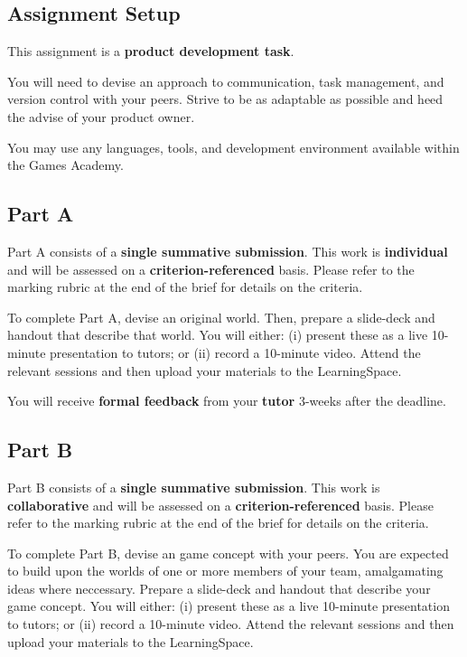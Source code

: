 \documentclass{../../fal_assignment}
\begin{document}
\subsection*{Assignment Setup}

This assignment is a \textbf{product development task}. 

You will need to devise an approach to communication, task management, and version control with your peers. Strive to be as adaptable as possible and heed the advise of your product owner.

You may use any languages, tools, and development environment available within the Games Academy.

\subsection*{Part A}

Part A consists of a \textbf{single summative submission}. This work is \textbf{individual} and will be assessed on a \textbf{criterion-referenced} basis. Please refer to the marking rubric at the end of the brief for details on the criteria.

To complete Part A, devise an original world. Then, prepare a slide-deck and handout that describe that world. You will either: (i) present these as a live 10-minute presentation to tutors; or (ii) record a 10-minute video. Attend the relevant sessions and then upload your materials to the LearningSpace.

You will receive \textbf{formal feedback} from your \textbf{tutor} 3-weeks after the deadline.

\subsection*{Part B}

Part B consists of a \textbf{single summative submission}. This work is \textbf{collaborative} and will be assessed on a \textbf{criterion-referenced} basis. Please refer to the marking rubric at the end of the brief for details on the criteria.

To complete Part B, devise an game concept with your peers. You are expected to build upon the worlds of one or more members of your team, amalgamating ideas where neccessary. Prepare a slide-deck and handout that describe your game concept. You will either: (i) present these as a live 10-minute presentation to tutors; or (ii) record a 10-minute video. Attend the relevant sessions and then upload your materials to the LearningSpace.
\end{document}
